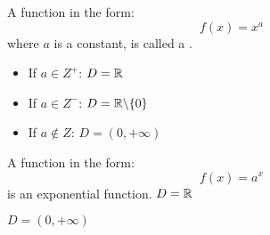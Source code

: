 
            \par A function in the form:
            \begin{equation}
                f(x) = x^{a}
            \end{equation}
            where $a$ is a constant, is called a .
            \begin{itemize}
                \item If $a \in Z^{+}$: $D = \mathbb{R}$
                \item If $a \in Z^{-}$: $D = \mathbb{R} \backslash \{0\}$
                \item If $a \not \in Z$: $D = (0, + \infty)$
            \end{itemize}

    \hiiEND





            \par A function in the form:
            \begin{equation}
                f(x) = a^{x}
            \end{equation}
            is an exponential function.
            $D = \mathbb{R}$
    \hiiEND

            $D = (0, + \infty)$
    \hiiEND

